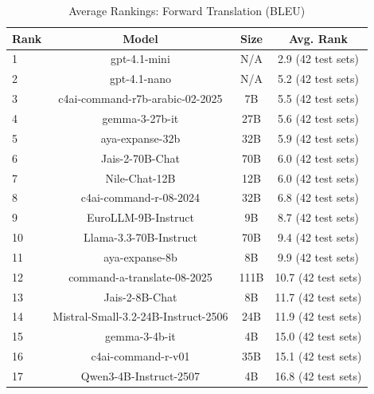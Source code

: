 \begin{table}[htbp]
\centering
\caption{Average Rankings: Forward Translation (BLEU)}
\label{tab:avg_rankings_bleu}
\begin{tabular}{l@{\hspace{3pt}}c@{\hspace{3pt}}c@{\hspace{3pt}}c}
\toprule
Rank & Model & Size & Avg. Rank \\
\midrule
1 & gpt-4.1-mini & N/A & 2.9 (42 test sets) \\
2 & gpt-4.1-nano & N/A & 5.2 (42 test sets) \\
3 & c4ai-command-r7b-arabic-02-2025 & 7B & 5.5 (42 test sets) \\
4 & gemma-3-27b-it & 27B & 5.6 (42 test sets) \\
5 & aya-expanse-32b & 32B & 5.9 (42 test sets) \\
6 & Jais-2-70B-Chat & 70B & 6.0 (42 test sets) \\
7 & Nile-Chat-12B & 12B & 6.0 (42 test sets) \\
8 & c4ai-command-r-08-2024 & 32B & 6.8 (42 test sets) \\
9 & EuroLLM-9B-Instruct & 9B & 8.7 (42 test sets) \\
10 & Llama-3.3-70B-Instruct & 70B & 9.4 (42 test sets) \\
11 & aya-expanse-8b & 8B & 9.9 (42 test sets) \\
12 & command-a-translate-08-2025 & 111B & 10.7 (42 test sets) \\
13 & Jais-2-8B-Chat & 8B & 11.7 (42 test sets) \\
14 & Mistral-Small-3.2-24B-Instruct-2506 & 24B & 11.9 (42 test sets) \\
15 & gemma-3-4b-it & 4B & 15.0 (42 test sets) \\
16 & c4ai-command-r-v01 & 35B & 15.1 (42 test sets) \\
17 & Qwen3-4B-Instruct-2507 & 4B & 16.8 (42 test sets) \\
\bottomrule
\end{tabular}
\end{table}